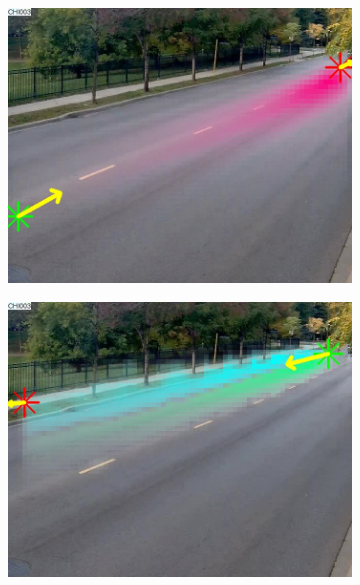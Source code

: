 \begin{figure}
    \centering
        \begin{subfigure}{0.32\linewidth}
            \includegraphics[width=\linewidth]{./img/scene_learning/res/ILCHI_CHI003/ILCHI_CHI003_20151010_075033_051-0.jpg}
        \end{subfigure}
        \begin{subfigure}{0.32\linewidth}
            \includegraphics[width=\linewidth]{./img/scene_learning/res/ILCHI_CHI003/ILCHI_CHI003_20151010_075033_051-1.jpg}
        \end{subfigure}
                \begin{subfigure}{0.32\linewidth}

\end{subfigure}
\end{figure}
